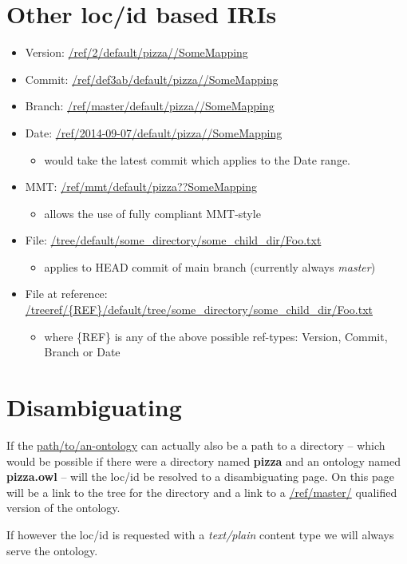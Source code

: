 \documentclass[a4paper,11pt,DIV=22]{scrartcl}
\begin{document}
\section{Other loc/id based IRIs}

\begin{itemize}
  \item Version: \url{/ref/2/default/pizza//SomeMapping}
  \item Commit: \url{/ref/def3ab/default/pizza//SomeMapping}
  \item Branch: \url{/ref/master/default/pizza//SomeMapping}
  \item Date: \url{/ref/2014-09-07/default/pizza//SomeMapping}
    \begin{itemize}
      \item would take the latest commit which applies to the Date range.
    \end{itemize}
  \item MMT: \url{/ref/mmt/default/pizza??SomeMapping}
    \begin{itemize}
      \item allows the use of fully compliant MMT-style
    \end{itemize}
  \item File: \url{/tree/default/some_directory/some_child_dir/Foo.txt}
    \begin{itemize}
      \item applies to HEAD commit of main branch (currently always \emph{master})
    \end{itemize}
  \item File at reference: \url{/treeref/{REF}/default/tree/some_directory/some_child_dir/Foo.txt}
    \begin{itemize}
      \item where \{REF\} is any of the above possible ref-types: Version, Commit, Branch or Date
    \end{itemize}
\end{itemize}

\section{Disambiguating}

If the \url{path/to/an-ontology} can actually also be a path to a directory  --
which would be possible if there were a directory named \textbf{pizza} and an
ontology named \textbf{pizza.owl} -- will the loc/id be resolved to a
disambiguating page. On this page will be a link to the tree for the directory
and a link to a \url{/ref/master/} qualified version of the ontology.

If however the loc/id is requested with a \emph{text/plain} content type we
will always serve the ontology.
\end{document}
